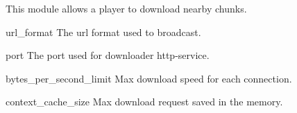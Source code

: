 
This module allows a player to download nearby chunks.


\begin{Configuration}
    \item[url\_format]{
        The url format used to broadcast.
    }

    \item[port] {
        The port used for downloader http-service.
    }

    \item[bytes\_per\_second\_limit]{
        Max download speed for each connection.
    }

    \item[context\_cache\_size]{
        Max download request saved in the memory.
    }
\end{Configuration}


